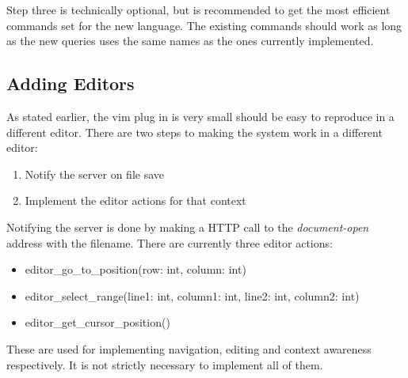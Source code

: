 \documentclass[../thesis.tex]{subfiles}
\begin{document}
Step three is technically optional, but is recommended to get the most efficient commands set for the new language.
The existing commands should work as long as the new queries uses the same names as the ones currently implemented.

\subsection{Adding Editors}%
\label{sec:adding_editors}
As stated earlier, the vim plug in is very small should be easy to reproduce in a different editor.
There are two steps to making the system work in a different editor:
\begin{enumerate}
    \item Notify the server on file save
    \item Implement the editor actions for that context
\end{enumerate}
Notifying the server is done by making a HTTP call to the \textit{document-open} address with the filename.
There are currently three editor actions:
\begin{itemize}
    \item editor\_go\_to\_position(row: int, column: int)
    \item editor\_select\_range(line1: int, column1: int, line2: int, column2: int)
    \item editor\_get\_cursor\_position()
\end{itemize}
These are used for implementing navigation, editing and context awareness respectively.
It is not strictly necessary to implement all of them.
\end{document}
